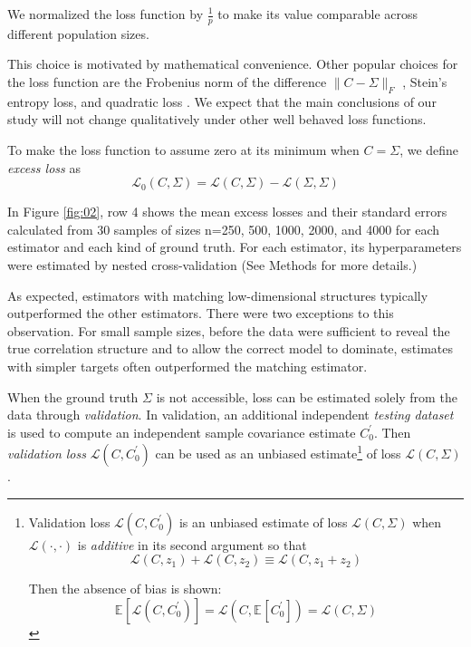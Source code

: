 \documentclass[10pt]{article}
\newcommand{\loss}[1]{\mathcal L\left(#1\right)}
\newcommand{\eloss}[1]{\mathcal L_0\left(#1\right)}
\newcommand{\E}[2][]{\mathbb E_{#1}\left[ #2\right]}    %
\begin{document}
We normalized the loss function  by $\frac 1 p$ to make its value comparable across different population sizes. 

This choice is motivated by mathematical convenience. Other popular choices for the loss function are the Frobenius norm of the difference $\|C-\Sigma\|_F$ \cite{Ledoit:2004,Schafer:2005}, Stein's entropy loss, and quadratic loss \cite{James:1961,Fan:2008}.  We expect that the main conclusions of our study will not change qualitatively under other well behaved loss functions.

To make the loss function to assume zero at its minimum when $C=\Sigma$, we define \emph{excess loss} as
\begin{equation}\label{eq:excess-loss}
    \eloss{C,\Sigma} = \loss{C,\Sigma}-\loss{\Sigma,\Sigma}
\end{equation}

In Figure \ref{fig:02}, row 4 shows the mean excess losses and their standard errors calculated from 30 samples of sizes n=250, 500, 1000, 2000, and 4000 for each estimator and each kind of ground truth. For each estimator, its hyperparameters were estimated by nested cross-validation (See Methods for more details.)

As expected, estimators with matching low-dimensional structures typically outperformed the other estimators. There were two exceptions to this observation. For small sample sizes, before the data were sufficient to reveal the true correlation structure and to  allow the correct model to dominate, estimates with simpler targets often outperformed the matching estimator.

When the ground truth $\Sigma$ is not accessible, loss can be estimated solely from the data through \emph{validation}.  In validation, an additional independent \emph{testing dataset} is used to compute an independent sample covariance estimate $C_0^\prime$.  Then \emph{validation loss} $\loss{C,C_0^\prime}$ can be used as an unbiased estimate\footnote
{
    Validation loss $\loss{C,C_0^\prime}$ is an unbiased estimate of loss $\loss{C,\Sigma}$ when $\loss{\cdot,\cdot}$ is \emph{additive} in its second argument so that 
 \begin{equation*}\label{eq:additivity}
 \loss{C,z_1} + \loss{C,z_2} \equiv \loss{C,z_1+z_2}
 \end{equation*}

Then the absence of bias is shown:
\begin{equation*}
    \E{\loss{C,C_0^\prime}}=\loss{C,\E{C_0^\prime}}=\loss{C,\Sigma}
\end{equation*}
} 
of loss $\loss{C,\Sigma}$.
\end{document}
